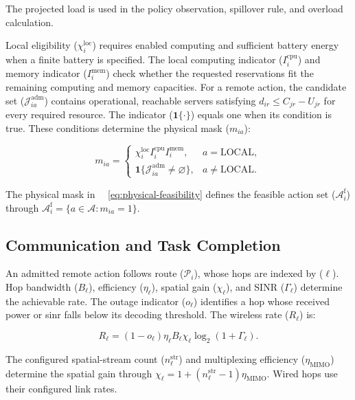 \documentclass[journal]{IEEEtran}
\providecommand*{\algorithmautorefname}{Algorithm}
\providecommand*{\figureautorefname}{Figure}
\providecommand*{\subfigureautorefname}{Figure}
\providecommand*{\Autoref}[1]{%
  \begingroup
  \def\sectionautorefname{Section}%
  \def\subsectionautorefname{Subsection}%
  \def\subsubsectionautorefname{Subsubsection}%
  \def\algorithmautorefname{Algorithm}%
  \def\figureautorefname{Figure}%
  \def\subfigureautorefname{Figure}%
 ~\autoref{#1}%
  \endgroup
}
\newcommand{\Autoref}[1]{Eq.~\Autoref{#1}}
\begin{document}
The projected load is used in the policy observation, spillover rule, and overload calculation.

Local eligibility (\(\chi_i^{\mathrm{loc}}\)) requires enabled computing and sufficient battery energy when a finite battery is specified. The local computing indicator (\(I_i^{\mathrm{cpu}}\)) and memory indicator (\(I_i^{\mathrm{mem}}\)) check whether the requested reservations fit the remaining computing and memory capacities. For a remote action, the candidate set (\(\mathcal J_{ia}^{\mathrm{adm}}\)) contains operational, reachable servers satisfying \(d_{ir}\leq C_{jr}-U_{jr}\) for every required resource. The indicator (\(\mathbf1\{\cdot\}\)) equals one when its condition is true. These conditions determine the physical mask (\(m_{ia}\)):

\begin{equation}
\label{eq:physical-feasibility}
m_{ia}=
\begin{cases}
\chi_i^{\mathrm{loc}}
I_i^{\mathrm{cpu}}I_i^{\mathrm{mem}},
&a=\mathrm{LOCAL},\\
\mathbf1\{\mathcal J_{ia}^{\mathrm{adm}}\neq\varnothing\},
&a\neq\mathrm{LOCAL}.
\end{cases}
\end{equation}

The physical mask in~\Autoref{eq:physical-feasibility} defines the feasible action set (\(\mathcal A_i^{\mathrm f}\)) through \(\mathcal A_i^{\mathrm f}=\{a\in\mathcal A:m_{ia}=1\}\). 


\subsection{Communication and Task Completion}
\label{subsec:communication-completion}

An admitted remote action follows route (\(\mathcal P_i\)), whose hops are indexed by (\(\ell\)). Hop bandwidth (\(B_\ell\)), efficiency (\(\eta_\ell\)), spatial gain (\(\chi_\ell\)), and SINR (\(\Gamma_\ell\)) determine the achievable rate. The outage indicator (\(o_\ell\)) identifies a hop whose received power or \acs{sinr} falls below its decoding threshold. The wireless rate (\(R_\ell\)) is:

\begin{equation}
\label{eq:wireless-rate}
R_\ell
=
(1-o_\ell)\eta_\ell B_\ell\chi_\ell
\log_2(1+\Gamma_\ell).
\end{equation}

The configured spatial-stream count (\(n_\ell^{\mathrm{str}}\)) and multiplexing efficiency (\(\eta_{\mathrm{MIMO}}\)) determine the spatial gain through \(\chi_\ell=1+(n_\ell^{\mathrm{str}}-1)\eta_{\mathrm{MIMO}}\). Wired hops use their configured link rates.
\end{document}
